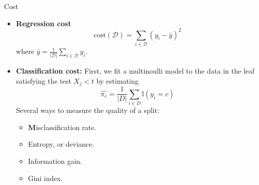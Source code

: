 \documentclass[10pt,mathserif]{beamer}
\begin{document}
\begin{frame}{Cost}
\begin{itemize}
    \item \textbf{Regression cost}
    \begin{equation*}
        \text{cost}(\mathcal{D}) =  \sum_{i\in \mathcal{D}}(y_i - \bar{y})^2
    \end{equation*}
    where $\bar{y} = \frac{1}{|\mathcal{D}|}\sum_{i\in \mathcal{D}}y_i$.
    \item \textbf{Classification cost:}
    First, we fit a multinoulli model to the data in the leaf satisfying the test $X_j < t$ by estimating
        \begin{equation*}
            \hat{\pi_c} = \frac{1}{|D|}\sum_{i\in D}\mathbb{I}(y_i = c)
        \end{equation*}
    Several ways to measure the quality of a split:
    \begin{itemize}
        \item \textbf Misclassification rate.
        \item Entropy, or deviance.
        \item Information gain.
        \item Gini index.
    \end{itemize}
\end{itemize}
\end{frame}
\end{document}
